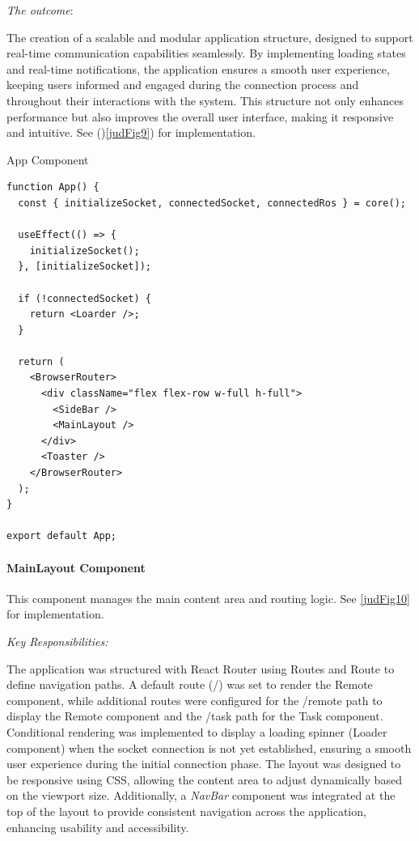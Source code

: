 \documentclass[../../main]{subfiles}
\begin{document}
\emph{The outcome}:

The creation of a scalable and modular application structure, designed
to support real-time communication capabilities seamlessly. By
implementing loading states and real-time notifications, the application
ensures a smooth user experience, keeping users informed and engaged
during the connection process and throughout their interactions with the
system. This structure not only enhances performance but also improves
the overall user interface, making it responsive and intuitive. See
()\cref{judFig9}) for implementation.

\begin{codebox}[label=judFig9]{App Component}
  \begin{verbatim}
function App() {
  const { initializeSocket, connectedSocket, connectedRos } = core();

  useEffect(() => {
    initializeSocket();
  }, [initializeSocket]);

  if (!connectedSocket) {
    return <Loarder />;
  }

  return (
    <BrowserRouter>
      <div className="flex flex-row w-full h-full">
        <SideBar />
        <MainLayout />
      </div>
      <Toaster />
    </BrowserRouter>
  );
}

export default App;
\end{verbatim}
\end{codebox}

\paragraph{MainLayout Component}

This component manages the main content area and routing logic. See
\cref{judFig10} for implementation.

\emph{Key Responsibilities:}

The application was structured with React Router using Routes and Route
to define navigation paths. A default route (/) was set to render the
Remote component, while additional routes were configured for the
/remote path to display the Remote component and the /task path for the
Task component. Conditional rendering was implemented to display a
loading spinner (Loader component) when the socket connection is not yet
established, ensuring a smooth user experience during the initial
connection phase. The layout was designed to be responsive using CSS,
allowing the content area to adjust dynamically based on the viewport
size. Additionally, a \emph{NavBar} component was integrated at the top
of the layout to provide consistent navigation across the application,
enhancing usability and accessibility.
\end{document}
